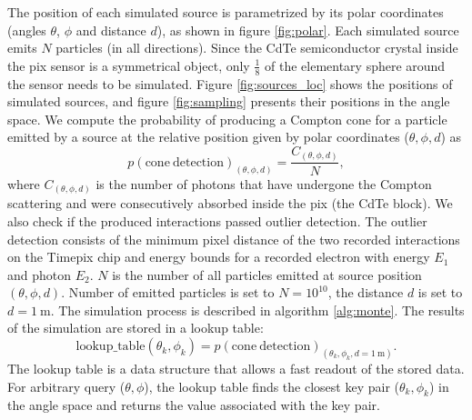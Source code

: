 The position of each simulated source is parametrized by its polar coordinates (angles $\theta$, $\phi$ and distance $d$), as shown in figure \ref{fig:polar}.
Each simulated source emits $N$ particles (in all directions).
Since the \ac{CdTe} semiconductor crystal inside the \ac{pix} sensor is a symmetrical object, only $\frac{1}{8}$ of the elementary sphere around the sensor needs to be simulated.
Figure \ref{fig:sources_loc} shows the positions of simulated sources, and figure \ref{fig:sampling} presents their positions in the angle space.
We compute the probability of producing a Compton cone for a particle emitted by a source at the relative position given by polar coordinates ($\theta, \phi, d$) as
\begin{equation}
  p(\mathrm{cone\ detection})_{(\theta, \phi, d)} = \frac{C_{(\theta, \phi, d)}}{N},
\end{equation} 
where $C_{(\theta, \phi, d)}$ is the number of photons that have undergone the Compton scattering and were consecutively absorbed inside the \ac{pix} (the \ac{CdTe} block). 
We also check if the produced interactions passed outlier detection. %
The outlier detection consists of the minimum pixel distance of the two recorded interactions on the Timepix chip and energy bounds for a recorded electron with energy $E_{1}$ and photon $E_{2}$. 
$N$ is the number of all particles emitted at source position $(\theta, \phi, d)$. 
Number of emitted particles is set to $N = 10^{10}$, the distance $d$ is set to $d = \SI{1}\meter$.
The simulation process is described in algorithm \ref{alg:monte}. 
The results of the simulation are stored in a lookup table:
\begin{equation}
  \mathrm{lookup\_table}(\theta_{k}, \phi_{k}) = p(\mathrm{cone\ detection})_{(\theta_{k}, \phi_{k}, d = \SI{1}\meter)}. 
\end{equation}
The lookup table is a data structure that allows a fast readout of the stored data.
For arbitrary query ($\theta, \phi$), the lookup table finds the closest key pair ($\theta_{k}, \phi_{k}$) in the angle space and returns the value associated with the key pair.%

